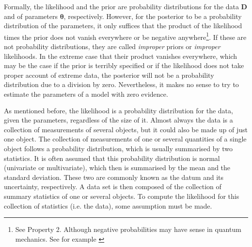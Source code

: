 Formally, the likelihood and the prior are probability distributions for the data $\mathbf{D}$ and of parameters $\mathbf{\theta}$, respectively. However, for the posterior to be a probability distribution of the parameters, it only suffices that the product of the likelihood times the prior does not vanish everywhere or be negative anywhere\footnote{See Property 2. Although negative probabilities may have sense in quantum mechanics. See for example \citet{1942RSPSA.180....1D}}. If these are not probability distributions, they are called \emph{improper} priors or \emph{improper} likelihoods. In the extreme case that their product vanishes everywhere, which may be the case if the prior is terribly specified or if the likelihood does not take proper account of extreme data, the posterior will not be a probability distribution due to a division by zero. Nevertheless, it makes no sense to try to estimate the parameters of a model with zero evidence.

%

As mentioned before, the likelihood is a probability distribution for the data, given the parameters, regardless of the size of it. Almost always the data is a collection of measurements of several objects, but it could also be made up of just one object. The collection of measurements of one or several quantities of a single object follows a probability distribution, which is usually summarised by two statistics. It is often assumed that this probability distribution is normal (univariate or multivariate), which then is summarised by the mean and the standard deviation. These two are commonly known as the datum and its uncertainty, respectively. A data set is then composed of the collection of summary statistics of one or several objects. To compute the likelihood for this collection of statistics (i.e. the data), some assumption must be made. 

